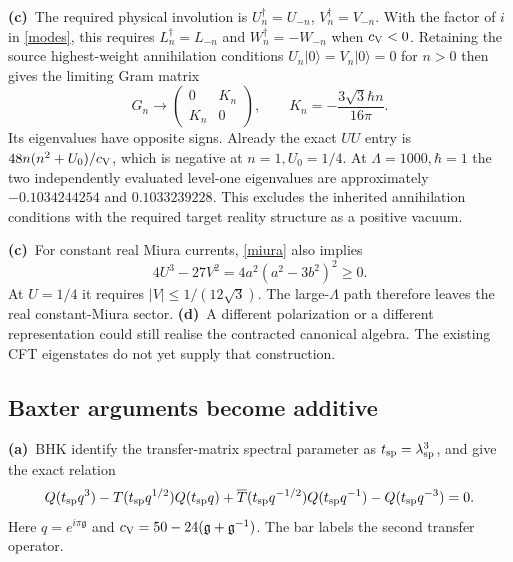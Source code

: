 \documentclass[11pt,a4paper]{article}
\newcommand{\A}{\textbf{(a)}\ }
\newcommand{\C}{\textbf{(c)}\ }
\newcommand{\D}{\textbf{(d)}\ }
\begin{document}
\C The required physical involution is
$U_n^\dagger=U_{-n}$, $V_n^\dagger=V_{-n}$. With the factor of $i$ in
\eqref{modes}, this requires $L_n^\dagger=L_{-n}$ and
$W_n^\dagger=-W_{-n}$ when $c_{\rm V}<0$.
Retaining the source highest-weight annihilation conditions
$U_n|0\rangle=V_n|0\rangle=0$ for $n>0$ then gives the limiting Gram matrix
\begin{equation}
 G_n\longrightarrow
 \begin{pmatrix}0&K_n\\K_n&0\end{pmatrix},
 \qquad K_n=-\frac{3\sqrt3\hbar n}{16\pi}.
 \label{gram}
\end{equation}
Its eigenvalues have opposite signs. Already the exact $UU$ entry is
$48n(n^2+U_0)/c_{\rm V}$, which is negative at $n=1,U_0=1/4$.
At $\Lambda=1000,\hbar=1$ the two independently evaluated level-one
eigenvalues are approximately $-0.1034244254$ and $0.1033239228$.
This excludes the inherited annihilation conditions with the required
target reality structure as a positive vacuum.

\C For constant real Miura currents, \eqref{miura} also implies
\begin{equation}
 4U^3-27V^2=4a^2(a^2-3b^2)^2\geq0.
 \label{discriminant}
\end{equation}
At $U=1/4$ it requires $|V|\leq1/(12\sqrt3)$.
The large-$\Lambda$ path therefore leaves the real constant-Miura sector.
\D A different polarization or a different representation could still
realise the contracted canonical algebra. The existing CFT eigenstates
do not yet supply that construction.

\subsection{Baxter arguments become additive}
\A BHK identify the transfer-matrix spectral parameter as
$t_{\rm sp}=\lambda_{\rm sp}^3$, and give the exact relation
\begin{equation}
 Q(t_{\rm sp}q^3)-T(t_{\rm sp}q^{1/2})Q(t_{\rm sp}q)
 +\overline T(t_{\rm sp}q^{-1/2})Q(t_{\rm sp}q^{-1})
 -Q(t_{\rm sp}q^{-3})=0.
 \label{source-baxter}
\end{equation}
Here $q=e^{i\pi\mathfrak g}$ and
$c_{\rm V}=50-24(\mathfrak g+\mathfrak g^{-1})$.
The bar labels the second transfer operator.
\end{document}
